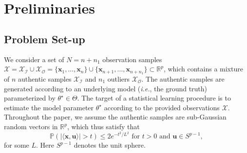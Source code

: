 \documentclass[11pt]{article}
\begin{document}
\section{Preliminaries}



\subsection{Problem Set-up}	
We consider a set of $N{=}n{+}n_1$ observation samples $\mathcal{X} = \mathcal{X}_\mathcal{I} \cup \mathcal{X}_\mathcal{O} = \{\mathbf{x}_1,\ldots,\mathbf{x}_n\} \cup \{\mathbf{x}_{n+1},\ldots, \mathbf{x}_{n+n_1}\} \subset \mathbb{R}^{p}$, which contains a mixture of $n$ authentic samples $\mathcal{X}_\mathcal{I}$ and $n_1$ outliers $ \mathcal{X}_\mathcal{O} $.  The authentic samples are generated according to an underlying model (\emph{i.e.}, the ground truth)  parameterized by ${\theta}^\star \in \Theta$.  The target of a statistical learning procedure is to estimate the model parameter $ \theta^\star $ according to the provided observations $ \mathcal{X} $. Throughout the paper, we assume the authentic samples are sub-Gaussian random vectors in $ \mathbb{R}^p $, which thus satisfy that
\begin{equation}\label{eqn:subgaussian}
\mathbb{P}(|\langle \mathbf{x},\mathbf{u} \rangle |>t)\leq 2e^{-t^2/L^2}  \text{ for } t>0  \text{ and } \mathbf{u} \in {S}^{p-1},
\end{equation}
for some $ L $. Here ${S}^{p-1}$ denotes the unit sphere. 

\end{document}

